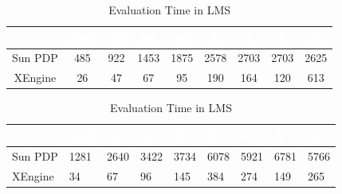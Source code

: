 \begin{table}[t]
\centering
\begin{tabular}{|>{\tiny}c|>{\tiny}c|>{\tiny}c|>{\tiny}c|>{\tiny}c|>{\tiny}c|>{\tiny}c|>{\tiny}c|>{\tiny}c|}   
\hline  \rowcolor{black} \scriptsize \bf \textcolor {white}{}
& \scriptsize \bf \textcolor {white}{SAR}
& \scriptsize \bf \textcolor {white}{AR}
& \scriptsize \bf \textcolor  {white}{SA}
& \scriptsize \bf \textcolor  {white}{SR}
& \scriptsize \bf \textcolor  {white}{R}
& \scriptsize \bf \textcolor  {white}{S} 
& \scriptsize \bf \textcolor  {white}{A}
& \scriptsize \bf \textcolor {white}{IA}\\ \hline
\scriptsize  {Sun PDP }
&\scriptsize  {485}
& \scriptsize {922}
& \scriptsize {1453}
& \scriptsize {1875}
& \scriptsize {2578}
& \scriptsize {2703}
& \scriptsize {2703}
& \scriptsize {2625}
  \\ \hline
\scriptsize  {XEngine}
&\scriptsize  {26}
& \scriptsize {47}
& \scriptsize {67}
& \scriptsize {95}
& \scriptsize {190}
& \scriptsize {164}
& \scriptsize {120}
& \scriptsize {613}
  \\ \hline
\end{tabular}

\caption{Evaluation Time in LMS}
\label{table:LMSeval}
\vspace{5 mm}
\centering
\begin{tabular}{|l|l|l|l|l|l|l|l|l|}   
\hline  \rowcolor{black} \scriptsize \bf \textcolor {white}{}
& \scriptsize \bf \textcolor {white}{SAR}
& \scriptsize \bf \textcolor {white}{AR}
& \scriptsize \bf \textcolor  {white}{SA}
& \scriptsize \bf \textcolor  {white}{SR}
& \scriptsize \bf \textcolor  {white}{R}
& \scriptsize \bf \textcolor  {white}{S} 
& \scriptsize \bf \textcolor  {white}{A}
& \scriptsize \bf \textcolor {white}{IA}\\ \hline
\scriptsize  {Sun PDP }
& \scriptsize  {1281}
& \scriptsize {2640}
& \scriptsize {3422}
& \scriptsize {3734}
& \scriptsize {6078}
& \scriptsize {5921}
& \scriptsize {6781}
& \scriptsize {5766}
  \\ \hline
\scriptsize  {XEngine}
& \scriptsize  {34}
& \scriptsize {67}
& \scriptsize {96}
& \scriptsize {145}
& \scriptsize {384}
& \scriptsize {274}
& \scriptsize {149}
& \scriptsize {265}
  \\ \hline
\end{tabular}


\end{table}
